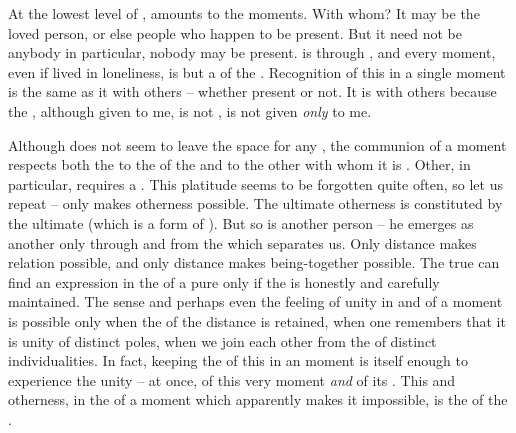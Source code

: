 \newp

\pa\imm At the lowest level of , 
amounts to  the  moments.  With whom? It may be
the loved person, or else people who happen to be present. But it need not be
anybody in particular, nobody may be  present.  
is  through , and every moment, even if lived in
loneliness, is but a  of the . Recognition of this
 in a single moment is the same as  it with others --
whether  present or not. It is  with others because the
, although given to me, is not , is not given {\em only} to
me.

Although  does not seem to leave the space for any ,
the  communion of a moment respects both the  to the
 of the  and to the other with whom it is .
Other, in particular, requires a . This platitude seems to be
forgotten quite often, so let us repeat -- only  makes otherness
possible. The ultimate otherness is constituted by the ultimate
 (which is a form of ). But so is another person
-- he emerges as another only through and from the  which separates
us. Only distance makes relation possible, and only distance makes
being-together possible. The true  can find an expression in the
 of a pure  only if the  is honestly and
carefully maintained. The sense and perhaps even the feeling of unity in and of
a moment is possible only when the  of the distance is retained, when
one remembers that it is unity of distinct poles, when we join each other from
the  of distinct individualities. In fact, keeping the 
of this  in an  moment is itself enough to experience
the unity -- at once, of  this very moment {\em and} of 
its .  This  and otherness,  in the
 of a moment which apparently makes it impossible, is the
 of the .

